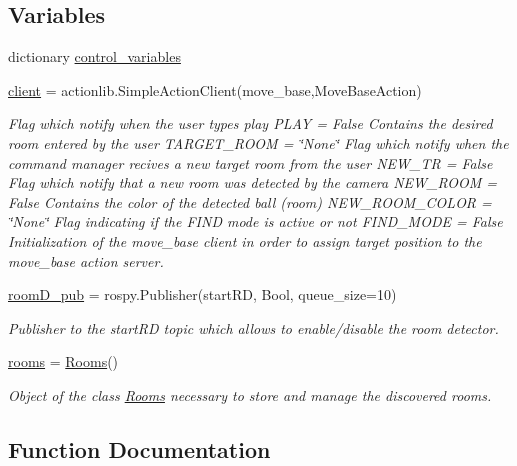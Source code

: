 \subsection*{Variables}
\begin{DoxyCompactItemize}
\item 
dictionary \hyperlink{namespacenoSleep_adbe81123b7abf75f19b461e802380fc1}{control\+\_\+variables}
\item 
\hyperlink{namespacenoSleep_ac8d2a8a17fd9bdac144f7cf8e268271d}{client} = actionlib.\+Simple\+Action\+Client(\textquotesingle{}move\+\_\+base\textquotesingle{},Move\+Base\+Action)
\begin{DoxyCompactList}\small\item\em Flag which notify when the user types \textquotesingle{}play\textquotesingle{} P\+L\+AY = False Contains the desired room entered by the user T\+A\+R\+G\+E\+T\+\_\+\+R\+O\+OM = \char`\"{}\+None\char`\"{} Flag which notify when the command manager recives a new target room from the user N\+E\+W\+\_\+\+TR = False Flag which notify that a new room was detected by the camera N\+E\+W\+\_\+\+R\+O\+OM = False Contains the color of the detected ball (room) N\+E\+W\+\_\+\+R\+O\+O\+M\+\_\+\+C\+O\+L\+OR = \char`\"{}\+None\char`\"{} Flag indicating if the F\+I\+ND mode is active or not F\+I\+N\+D\+\_\+\+M\+O\+DE = False Initialization of the move\+\_\+base client in order to assign target position to the move\+\_\+base action server. \end{DoxyCompactList}\item 
\hyperlink{namespacenoSleep_a9556e14c4f96e9bd3a98d6313f1c971b}{room\+D\+\_\+pub} = rospy.\+Publisher(\textquotesingle{}start\+RD\textquotesingle{}, Bool, queue\+\_\+size=10)
\begin{DoxyCompactList}\small\item\em Publisher to the start\+RD topic which allows to enable/disable the room detector. \end{DoxyCompactList}\item 
\hyperlink{namespacenoSleep_a5d68f48fa901f367ed63cd1e4ac1aef9}{rooms} = \hyperlink{classRooms_1_1Rooms}{Rooms}()
\begin{DoxyCompactList}\small\item\em Object of the class \hyperlink{namespaceRooms}{Rooms} necessary to store and manage the discovered rooms. \end{DoxyCompactList}\end{DoxyCompactItemize}


\subsection{Function Documentation}
